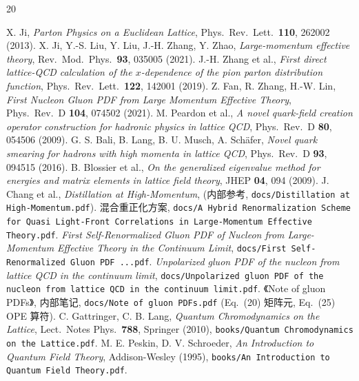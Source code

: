 \documentclass[11pt,a4paper]{article}
\begin{document}
\begin{thebibliography}{20}

 X. Ji, \textit{Parton Physics on a Euclidean Lattice},
Phys.\ Rev.\ Lett.\ \textbf{110}, 262002 (2013).
 X. Ji, Y.-S. Liu, Y. Liu, J.-H. Zhang, Y. Zhao,
\textit{Large-momentum effective theory}, Rev.\ Mod.\ Phys.\ \textbf{93}, 035005 (2021).
 J.-H. Zhang et al.,
\textit{First direct lattice-QCD calculation of the $x$-dependence of the pion parton distribution function},
Phys.\ Rev.\ Lett.\ \textbf{122}, 142001 (2019).
 Z. Fan, R. Zhang, H.-W. Lin,
\textit{First Nucleon Gluon PDF from Large Momentum Effective Theory},
Phys.\ Rev.\ D \textbf{104}, 074502 (2021).
 M. Peardon et al.,
\textit{A novel quark-field creation operator construction for hadronic physics in lattice QCD},
Phys.\ Rev.\ D \textbf{80}, 054506 (2009).
 G. S. Bali, B. Lang, B. U. Musch, A. Sch\"afer,
\textit{Novel quark smearing for hadrons with high momenta in lattice QCD},
Phys.\ Rev.\ D \textbf{93}, 094515 (2016).
 B. Blossier et al.,
\textit{On the generalized eigenvalue method for energies and matrix elements in lattice field theory},
JHEP \textbf{04}, 094 (2009).
 J. Chang et al., \textit{Distillation at High-Momentum},
(内部参考, \texttt{docs/Distillation at High-Momentum.pdf}).
 混合重正化方案,
\texttt{docs/A Hybrid Renormalization Scheme for Quasi Light-Front Correlations in Large-Momentum Effective Theory.pdf}.
 \textit{First Self-Renormalized Gluon PDF of Nucleon from
Large-Momentum Effective Theory in the Continuum Limit},
\texttt{docs/First Self-Renormalized Gluon PDF ...pdf}.
 \textit{Unpolarized gluon PDF of the nucleon from lattice QCD in the continuum limit},
\texttt{docs/Unpolarized gluon PDF of the nucleon from lattice QCD in the continuum limit.pdf}.
 《Note of gluon PDFs》, 内部笔记, \texttt{docs/Note of gluon PDFs.pdf}
(Eq.~(20) 矩阵元, Eq.~(25) OPE 算符).
 C. Gattringer, C. B. Lang,
\textit{Quantum Chromodynamics on the Lattice}, Lect.\ Notes Phys.\ \textbf{788}, Springer (2010),
\texttt{books/Quantum Chromodynamics on the Lattice.pdf}.
 M. E. Peskin, D. V. Schroeder,
\textit{An Introduction to Quantum Field Theory}, Addison-Wesley (1995),
\texttt{books/An Introduction to Quantum Field Theory.pdf}.

\end{thebibliography}
\end{document}
